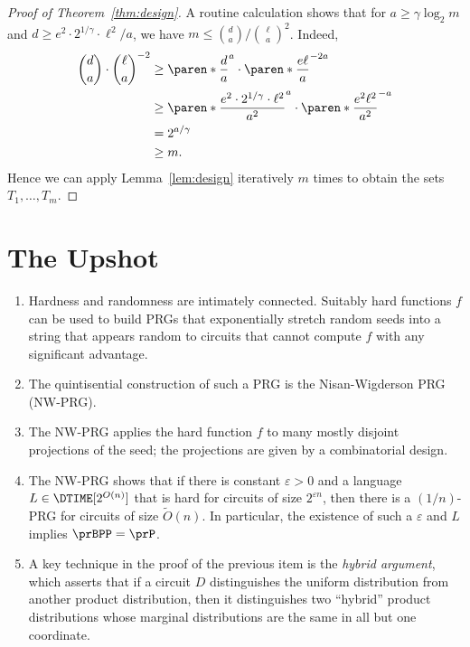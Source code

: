 \begin{proof}[Proof of Theorem~\ref{thm:design}]
  A routine calculation shows that for $a \ge \gamma \log_2{m}$ and $d \ge e^2
  \cdot 2^{1/\gamma} \cdot \ell^2/a$, we have $m \le \binom{d}{a} /
  \binom{\ell}{a}^2$. Indeed,
  \begin{align*}
    \binom{d}{a} \cdot \binom{\ell}{a}^{-2}
    &\ge \paren*{\frac{d}{a}}^a \cdot \paren*{\frac{e \ell}{a}}^{-2a}\\
    &\ge \paren*{\frac{e^2 \cdot 2^{1/\gamma} \cdot \ell^2}{a^2}}^{a} \cdot \paren*{\frac{e^2 \ell^2}{a^2}}^{-a}\\
    &= 2^{a / \gamma}\\
    &\ge m.
  \end{align*}
  Hence we can apply Lemma~\ref{lem:design} iteratively $m$ times to obtain the
  sets $T_1, \dots, T_m$.
\end{proof}

\section*{The Upshot}

\begin{enumerate}
  \item Hardness and randomness are intimately connected. Suitably hard
    functions $f$ can be used to build PRGs that exponentially stretch random
    seeds into a string that appears random to circuits that cannot compute $f$
    with any significant advantage.
  \item The quintisential construction of such a PRG is the Nisan-Wigderson PRG
    (NW-PRG).
  \item The NW-PRG applies the hard function $f$ to many mostly disjoint
    projections of the seed; the projections are given by a combinatorial
    design.
  \item The NW-PRG shows that if there is constant $\varepsilon > 0$ and a
    language $L \in \DTIME[2^{O(n)}]$ that is hard for circuits of size
    $2^{\varepsilon n}$, then there is a $(1/n)$-PRG for circuits of size
    $\widetilde{O}(n)$. In particular, the existence of such a $\varepsilon$ and
    $L$ implies $\prBPP = \prP$.
  \item A key technique in the proof of the previous item is the \emph{hybrid
    argument}, which asserts that if a circuit $D$ distinguishes the uniform
    distribution from another product distribution, then it distinguishes two
    ``hybrid'' product distributions whose marginal distributions are the same
    in all but one coordinate.
\end{enumerate}

